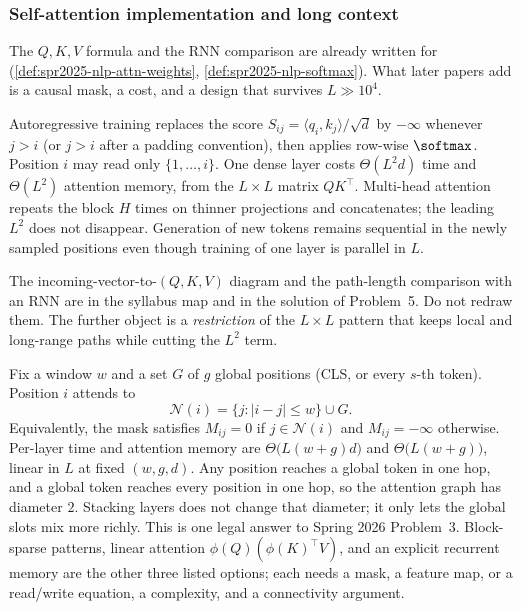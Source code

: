 \subsubsection{Self-attention implementation and long context}
\label{subsubsec:nlpu-attn}

The $Q,K,V$ formula and the RNN comparison are already written for  (\cref{def:spr2025-nlp-attn-weights}, \cref{def:spr2025-nlp-softmax}). What later papers add is a causal mask, a cost, and a design that survives $L\gg 10^4$.

\begin{proposition}
\label{prop:nlpu-causal}
Autoregressive training replaces the score $S_{ij}=\langle q_i,k_j\rangle/\sqrt{d}$ by $-\infty$ whenever $j>i$ (or $j>i$ after a padding convention), then applies row-wise $\softmax$. Position $i$ may read only $\{1,\dots,i\}$. One dense layer costs $\Theta(L^2 d)$ time and $\Theta(L^2)$ attention memory, from the $L\times L$ matrix $QK^\top$. Multi-head attention repeats the block $H$ times on thinner projections and concatenates; the leading $L^2$ does not disappear. Generation of new tokens remains sequential in the newly sampled positions even though training of one layer is parallel in $L$.
\end{proposition}

\begin{remark}
\label{rem:nlpu-attn-ptr}
The incoming-vector-to-$(Q,K,V)$ diagram and the path-length comparison with an RNN are in the syllabus map and in the solution of Problem~5. Do not redraw them. The further object is a \emph{restriction} of the $L\times L$ pattern that keeps local and long-range paths while cutting the $L^2$ term.
\end{remark}

\begin{proposition}
\label{prop:nlpu-window-global}
Fix a window $w$ and a set $G$ of $g$ global positions (CLS, or every $s$-th token). Position $i$ attends to
\[
\mathcal{N}(i)
=
\bigl\{j:\lvert i-j\rvert\le w\bigr\}
\cup
G.
\]
Equivalently, the mask satisfies $M_{ij}=0$ if $j\in\mathcal{N}(i)$ and $M_{ij}=-\infty$ otherwise. Per-layer time and attention memory are $\Theta\bigl(L(w+g)d\bigr)$ and $\Theta\bigl(L(w+g)\bigr)$, linear in $L$ at fixed $(w,g,d)$. Any position reaches a global token in one hop, and a global token reaches every position in one hop, so the attention graph has diameter $2$. Stacking layers does not change that diameter; it only lets the global slots mix more richly. This is one legal answer to Spring 2026 Problem~3. Block-sparse patterns, linear attention $\phi(Q)(\phi(K)^\top V)$, and an explicit recurrent memory are the other three listed options; each needs a mask, a feature map, or a read/write equation, a complexity, and a connectivity argument.
\end{proposition}

